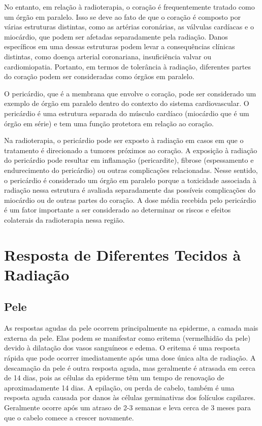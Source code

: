 \documentclass[11pt,a4paper]{article}
\newcounter{exemplo}
\begin{document}
	No entanto, em relação à radioterapia, o coração é frequentemente tratado como um órgão em paralelo. Isso se deve ao fato de que o coração é composto por várias estruturas distintas, como as artérias coronárias, as válvulas cardíacas e o miocárdio, que podem ser afetadas separadamente pela radiação. Danos específicos em uma dessas estruturas podem levar a consequências clínicas distintas, como doença arterial coronariana, insuficiência valvar ou cardiomiopatia. Portanto, em termos de tolerância à radiação, diferentes partes do coração podem ser consideradas como órgãos em paralelo.

	O pericárdio, que é a membrana que envolve o coração, pode ser considerado um exemplo de órgão em paralelo dentro do contexto do sistema cardiovascular. O pericárdio é uma estrutura separada do músculo cardíaco (miocárdio que é um órgão em série) e tem uma função protetora em relação ao coração.

	Na radioterapia, o pericárdio pode ser exposto à radiação em casos em que o tratamento é direcionado a tumores próximos ao coração. A exposição à radiação do pericárdio pode resultar em inflamação (pericardite), fibrose (espessamento e endurecimento do pericárdio) ou outras complicações relacionadas. Nesse sentido, o pericárdio é considerado um órgão em paralelo porque a toxicidade associada à radiação nessa estrutura é avaliada separadamente das possíveis complicações do miocárdio ou de outras partes do coração. A dose média recebida pelo pericárdio é um fator importante a ser considerado ao determinar os riscos e efeitos colaterais da radioterapia nessa região.

\section{Resposta de Diferentes Tecidos à Radiação }

\subsection*{Pele}

	As respostas agudas da pele ocorrem principalmente na epiderme, a camada mais externa da pele. Elas podem se manifestar como eritema (vermelhidão da pele) devido à dilatação dos vasos sanguíneos e edema. O eritema é uma resposta rápida que pode ocorrer imediatamente após uma dose única alta de radiação. A descamação da pele é outra resposta aguda, mas geralmente é atrasada em cerca de 14 dias, pois as células da epiderme têm um tempo de renovação de aproximadamente 14 dias. A epilação, ou perda de cabelo, também é uma resposta aguda causada por danos às células germinativas dos folículos capilares. Geralmente ocorre após um atraso de 2-3 semanas e leva cerca de 3 meses para que o cabelo comece a crescer novamente.
\end{document}
